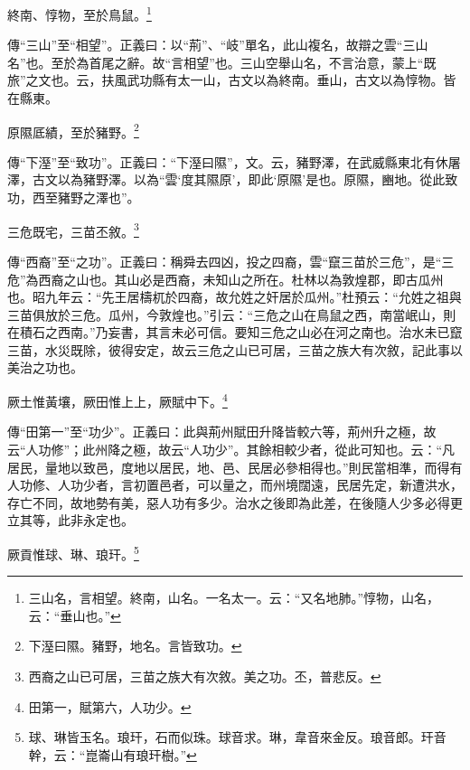 終南、惇物，至於鳥鼠。\footnote{三山名，言相望。終南，山名。一名太一。云：“又名地肺。”惇物，山名，云：“垂山也。”}

{\noindent\zhuan{}\fzbyks 傳“三山”至“相望”。正義曰：以“荊”、“岐”單名，此山複名，故辯之雲“三山名”也。至於為首尾之辭。故“言相望”也。三山空舉山名，不言治意，蒙上“既旅”之文也。云，扶風武功縣有太一山，古文以為終南。垂山，古文以為惇物。皆在縣東。 \par}

原隰厎績，至於豬野。\footnote{下溼曰隰。豬野，地名。言皆致功。}

{\noindent\zhuan{}\fzbyks 傳“下溼”至“致功”。正義曰：“下溼曰隰”，文。云，豬野澤，在武威縣東北有休屠澤，古文以為豬野澤。以為“雲‘度其隰原’，即此‘原隰’是也。原隰，豳地。從此致功，西至豬野之澤也”。 \par}

三危既宅，三苗丕敘。\footnote{西裔之山已可居，三苗之族大有次敘。美之功。丕，普悲反。}

{\noindent\zhuan{}\fzbyks 傳“西裔”至“之功”。正義曰：稱舜去四凶，投之四裔，雲“竄三苗於三危”，是“三危”為西裔之山也。其山必是西裔，未知山之所在。杜林以為敦煌郡，即古瓜州也。昭九年云：“先王居檮杌於四裔，故允姓之奸居於瓜州。”杜預云：“允姓之祖與三苗俱放於三危。瓜州，今敦煌也。”引云：“三危之山在鳥鼠之西，南當岷山，則在積石之西南。”乃妄書，其言未必可信。要知三危之山必在河之南也。治水未已竄三苗，水災既除，彼得安定，故云三危之山已可居，三苗之族大有次敘，記此事以美治之功也。 \par}

厥土惟黃壤，厥田惟上上，厥賦中下。\footnote{田第一，賦第六，人功少。}

{\noindent\zhuan{}\fzbyks 傳“田第一”至“功少”。正義曰：此與荊州賦田升降皆較六等，荊州升之極，故云“人功修”；此州降之極，故云“人功少”。其餘相較少者，從此可知也。云：“凡居民，量地以致邑，度地以居民，地、邑、民居必參相得也。”則民當相準，而得有人功修、人功少者，言初置邑者，可以量之，而州境闊遠，民居先定，新遭洪水，存亡不同，故地勢有美，惡人功有多少。治水之後即為此差，在後隨人少多必得更立其等，此非永定也。 \par}

厥貢惟球、琳、琅玕。\footnote{球、琳皆玉名。琅玕，石而似珠。球音求。琳，韋音來金反。琅音郎。玕音幹，云：“崑崙山有琅玕樹。”}

